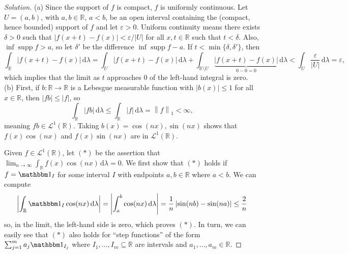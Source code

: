 \documentclass[10pt]{article}
\newcommand{\dd}{\,\mathrm{d}}
\providecommand{\eps}{\varepsilon}
\providecommand{\RR}{\mathbb R}
\providecommand{\ind}{\mathbbm 1}
\newenvironment{soln}{\begin{proof}[Solution]}{\end{proof}}
\providecommand{\abs}[1]{\left\lvert #1\right\rvert}
\providecommand{\norm}[1]{\left\| #1\right\|}
\begin{document}
\begin{soln}
    (a) Since the support of $f$ is compact, $f$ is uniformly continuous.
    Let $U=(a,b)$, with $a,b\in\RR$, $a<b$, be an open interval
    containing the (compact, hence bounded) support of $f$
    and let $\eps > 0$. Uniform continuity means there exists $\delta > 0$
    such that $\abs{f(x+t) - f(x)} < \eps/\abs U$
    for all $x,t\in\RR$ such that $t<\delta$.
    Also, $\inf\operatorname{supp}f > a$, so let $\delta'$ be the difference
    $\inf\operatorname{supp}f - a$.
    If $t < \min\{\delta,\delta'\}$, then
    \begin{equation*}
	\int_\RR \abs{f(x+t)-f(x)}\dd\lambda
	= \int_U \abs{f(x+t)-f(x)}\dd\lambda
	+ \int_{\RR\setminus U}\underbrace{\abs{f(x+t)-f(x)}}_{0-0=0}\dd\lambda
	< \int_U \frac{\eps}{\abs U}\dd\lambda = \eps,
    \end{equation*}
    which implies that the limit as $t$ approaches $0$
    of the left-hand integral is zero.
    \\

    (b) First, if $b\colon\RR\to\RR$ is a Lebesgue measurable function
    with $\abs{b(x)}\le 1$ for all $x\in\RR$, then $\abs{fb}\le \abs f$, so
    \begin{equation*}\tag{$\dagger$}
	\int_{\RR}\abs{fb}\dd\lambda \le \int_\RR\abs f\dd\lambda
	= \norm{f}_1 < \infty,
    \end{equation*}
    meaning $fb\in\mathcal L^1(\RR)$. Taking $b(x) = \cos(nx), \sin(nx)$
    shows that $f(x)\cos(nx)$ and $f(x)\sin(nx)$ are in $\mathcal L^1(\RR)$.

    Given $f\in\mathcal L^1(\RR)$, let $(*)$ be the assertion that
    $\lim_{n\to\infty}\int_\RR f(x)\cos(nx)\dd\lambda = 0$.
    We first show that $(*)$ holds if $f = \ind_I$ for some interval
    $I$ with endpoints $a,b\in\RR$ where $a<b$. We can compute
    \begin{align*}
	\abs{\int_\RR \ind_I\cos(nx)\dd\lambda} =
	\abs{\int_a^b\cos(nx)\dd\lambda}
	= \frac 1n\abs{\sin(nb) - \sin(na)} \le \frac 2n
    \end{align*}
    so, in the limit, the left-hand side is zero, which proves $(*)$.
    In turn, we can easily see that $(*)$ also holds for
    ``step functions'' of the form $\sum_{j=1}^m a_j\ind_{I_j}$
    where $I_1,\dots,I_m\subseteq\RR$ are intervals
    and $a_1,\dots,a_m\in\RR$.


\end{soln}
\end{document}
